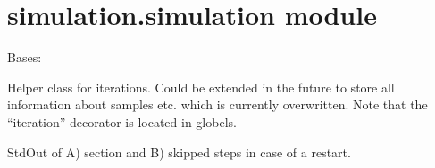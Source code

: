\documentclass[letterpaper,10pt,english]{sphinxmanual}
\begin{document}
\section{simulation.simulation module}
\label{\detokenize{simulation:module-simulation.simulation}}\label{\detokenize{simulation:simulation-simulation-module}}

\begin{fulllineitems}
\label{\detokenize{simulation:simulation.simulation.Iteration}}
Bases: 

Helper class for iterations. Could be extended in the future 
to store all information about samples etc. which is currently
overwritten. 
Note that the “iteration” decorator is located in globels.

\begin{fulllineitems}
\label{\detokenize{simulation:simulation.simulation.Iteration.start}}
StdOut of A) section and B) skipped steps in case of a restart.

\end{fulllineitems}


\end{fulllineitems}

\end{document}
